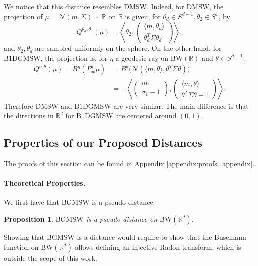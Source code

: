 \documentclass[twoside]{article}
\newtheorem{proposition}{Proposition}
\newcommand{\bP}{\mathbb{P}}
\newcommand{\cN}{\mathcal{N}}
\newcommand{\R}{\mathbb{R}}
\newcommand{\bw}{\mathrm{BW}}
\newcommand{\smwbg}{\mathrm{BGMSW}}
\newcommand{\smwbdg}{\mathrm{B1DGMSW}}
\begin{document}
We notice that this distance resembles $\mathrm{DMSW}$. Indeed, for $\mathrm{DMSW}$, the projection of $\mu=\cN(m,\Sigma)\sim \bP$ on $\R$ is given, for $\theta_d\in S^{d-1},\theta_2\in S^1$, by 
\begin{equation}
    Q^{\theta_d,\theta_1}(\mu) = \left\langle \theta_2, \begin{pmatrix} \langle m,\theta_d\rangle \\ \theta_d^T \Sigma\theta_d \end{pmatrix} \right\rangle,
\end{equation}
and $\theta_2,\theta_d$ are sampled uniformly on the sphere. On the other hand, for $\smwbdg$, the projection is, for $\eta$ a geodesic ray on $\bw(\R)$ and $\theta\in S^{d-1}$,
\begin{equation}
    \begin{aligned}
        Q^{\eta,\theta}(\mu) = B^\eta(P^\theta_\#\mu) &= B^\theta\big(\cN(\langle m,\theta\rangle, \theta^T \Sigma\theta)\big) \\
        &= -\left\langle \begin{pmatrix} m_1 \\ \sigma_1 - 1 \end{pmatrix}, \begin{pmatrix} \langle m,\theta\rangle \\ \theta^T \Sigma\theta - 1 \end{pmatrix} \right\rangle.
    \end{aligned}
\end{equation}
Therefore $\mathrm{DMSW}$ and $\smwbdg$ are very similar. The main difference is that the directions in $\R^2$ for $\smwbdg$ are centered around $(0,1)$. 










\subsection{Properties of our Proposed Distances}

The proofs of this section can be found in Appendix \ref{appendix:proofs_appendix}.


\paragraph{Theoretical Properties.}

We first have that $\smwbg$ is a pseudo distance.
\begin{proposition}
    $\smwbg$ is a pseudo-distance on $\bw(\R^d)$.
\end{proposition}
Showing that $\smwbg$ is a distance would require to show that the Busemann function on $\bw(\R^d)$ allows defining an injective Radon transform, which is outside the scope of this work.
\end{document}
